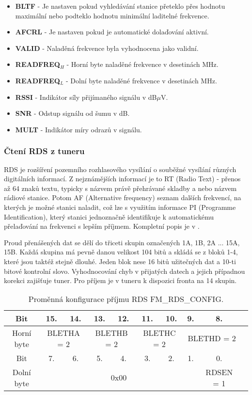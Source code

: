 \begin{itemize}
\item \textbf{BLTF} - Je nastaven pokud vyhledávání stanice přeteklo přes hodnotu maximální nebo podteklo hodnotu minimální laditelné frekvence.
\item \textbf{AFCRL} - Je nastaven pokud je automatické dolaďování aktivní.
\item \textbf{VALID} - Naladěná frekvence byla vyhodnocena jako validní. 
\item \textbf{READFREQ$_{{H}}$} - Horní byte naladěné frekvence v desetinách MHz.
\item \textbf{READFREQ$_{{L}}$} - Dolní byte naladěné frekvence v desetinách MHz.
\item \textbf{RSSI} - Indikátor síly přijímaného signálu v dB$\mu$V.
\item \textbf{SNR} - Odstup signálu od šumu v dB.
\item \textbf{MULT} - Indikátor míry odrazů v signálu.
\end{itemize}

\subsubsection{Čtení RDS z tuneru}
RDS je rozšíření pozemního rozhlasového vysílání o souběžné vysílání různých digitálních informací. Z nejznámějších informací je to RT (Radio Text) - přenos až 64 znaků textu, typicky s názvem právě přehrávané skladby a nebo názvem rádiové stanice. Potom AF  (Alternative frequency) seznam dalších frekvencí, na kterých je možné stanici naladit, což lze s využitím informace PI (Programme Identification), který stanici jednoznačně identifikuje k automatickému přelaďování na frekvenci s lepším příjmem. Kompletní popis je v \cite{rds}.

Proud přenášených dat se dělí do třiceti skupin označených 1A, 1B, 2A ... 15A, 15B. Každá skupina má pevně danou velikost 104 bitů a skládá se z bloků 1-4, které jsou taktéž stejně dlouhé. Jeden blok nese 16 bitů užitečných dat a 10-ti bitové kontrolní slovo. Vyhodnocování chyb v přijatých datech a jejich případnou korekci zajišťuje tuner. Pro příjem je v tuneru k dispozici fronta na 14 skupin.

\begin{table}[ht!]
\begin{center}
\begin{tabular}{|c|c|c|c|c|c|c|c|c|c|}
\hline 
Bit & 15. & 14. & 13. & 12. & 11. & 10. & 9. & 8. \\  
\hline 
Horní byte & \multicolumn{2}{c|}{BLETHA = 2} & \multicolumn{2}{c|}{BLETHB = 2} & \multicolumn{2}{c|}{BLETHC = 2} & \multicolumn{2}{c|}{BLETHD = 2} \\ 
\hline 
Bit & 7. & 6. & 5. & 4. & 3. & 2. & 1. & 0. \\
\hline 
Dolní byte & \multicolumn{7}{c|}{0x00} & RDSEN = 1 \\ 
\hline 
\end{tabular} 
\end{center}
\caption{Proměnná konfigurace příjmu RDS FM\_RDS\_CONFIG.}
\label{tab:tuner-rds-config} 
\end{table}

